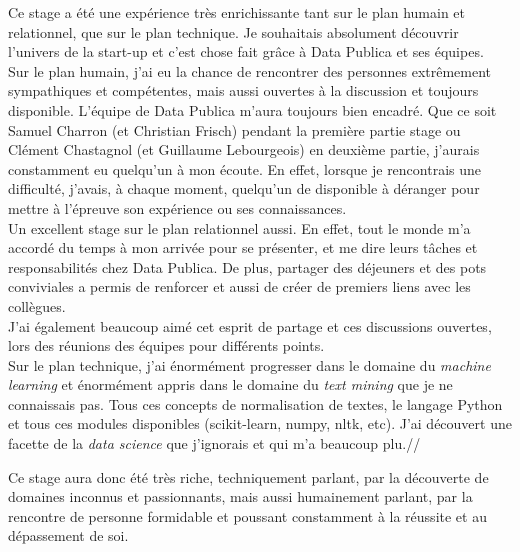 Ce stage a été une expérience très enrichissante tant sur le plan humain et relationnel, que sur le plan technique. Je souhaitais absolument découvrir l'univers de la start-up et c'est chose fait grâce à Data Publica et ses équipes.\\

Sur le plan humain, j'ai eu la chance de rencontrer des personnes extrêmement sympathiques et compétentes, mais aussi ouvertes à la discussion et toujours disponible. L'équipe de Data Publica m'aura toujours bien encadré. Que ce soit Samuel Charron (et Christian Frisch) pendant la première partie stage ou Clément Chastagnol (et Guillaume Lebourgeois) en deuxième partie, j'aurais constamment eu quelqu'un à mon écoute. En effet, lorsque je rencontrais une difficulté, j'avais, à chaque moment, quelqu'un de disponible à \og déranger \fg pour mettre à l'épreuve son expérience ou ses connaissances.\\

Un excellent stage sur le plan relationnel aussi. En effet, tout le monde m'a accordé du temps à mon arrivée pour se présenter, et me dire leurs tâches et responsabilités chez Data Publica. De plus, partager des déjeuners et des pots conviviales a permis de renforcer et aussi de créer de premiers liens avec les collègues.\\

J'ai également beaucoup aimé cet esprit de partage et ces discussions ouvertes, lors des réunions des équipes pour différents points.\\

Sur le plan technique, j'ai énormément progresser dans le domaine du \textit{machine learning} et énormément appris dans le domaine du \textit{text mining} que je ne connaissais pas. Tous ces concepts de normalisation de textes, le langage Python et tous ces modules disponibles (scikit-learn, numpy, nltk, etc). J'ai découvert une facette de la \textit{data science} que j'ignorais et qui m'a beaucoup plu.//

Ce stage aura donc été très riche, techniquement parlant, par la découverte de domaines inconnus et passionnants, mais aussi humainement parlant, par la rencontre de personne formidable et poussant constamment à la réussite et au dépassement de soi.

